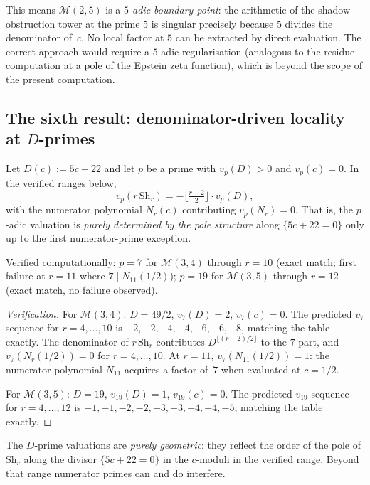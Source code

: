 \documentclass[11pt]{article}
\newcommand{\cM}{\mathcal{M}}
\begin{document}
This means $\cM(2,5)$ is a \emph{$5$-adic boundary point}: the
arithmetic of the shadow obstruction tower at the prime $5$ is singular
precisely because $5$ divides the denominator of~$c$.  No local
factor at $5$ can be extracted by direct evaluation.  The
correct approach would require a $5$-adic regularisation
(analogous to the residue computation at a pole of the Epstein
zeta function), which is beyond the scope of the present
computation.

\subsection*{The sixth result: denominator-driven locality at
$D$-primes}

\begin{proposition}
\label{prop:D-prime-locality}
Let $D(c) := 5c + 22$ and let $p$ be a prime with
$v_p(D) > 0$ and $v_p(c) = 0$.  In the verified ranges below,
\[
v_p(r\,\mathrm{Sh}_r)
= -\bigl\lfloor\tfrac{r-2}{2}\bigr\rfloor \cdot v_p(D),
\]
with the numerator polynomial $N_r(c)$ contributing
$v_p(N_r) = 0$.  That is, the $p$-adic valuation is
\emph{purely determined by the pole structure} along
$\{5c + 22 = 0\}$ only up to the first numerator-prime
exception.

Verified computationally: $p = 7$ for $\cM(3,4)$ through
$r = 10$ \textup{(}exact match; first failure at $r = 11$
where $7 \mid N_{11}(1/2)$\textup{)};
$p = 19$ for $\cM(3,5)$ through $r = 12$ \textup{(}exact
match, no failure observed\textup{)}.
\end{proposition}

\begin{proof}[Verification]
For $\cM(3,4)$: $D = 49/2$, $v_7(D) = 2$, $v_7(c) = 0$.
The predicted $v_7$ sequence for $r = 4,\ldots,10$ is
$-2,-2,-4,-4,-6,-6,-8$, matching the table exactly.
The denominator of $r\,\mathrm{Sh}_r$ contributes
$D^{\lfloor(r-2)/2\rfloor}$ to the $7$-part, and
$v_7(N_r(1/2)) = 0$ for $r = 4, \ldots, 10$.
At $r = 11$, $v_7(N_{11}(1/2)) = 1$: the numerator
polynomial $N_{11}$ acquires a factor of~$7$ when evaluated
at $c = 1/2$.

For $\cM(3,5)$: $D = 19$, $v_{19}(D) = 1$, $v_{19}(c) = 0$.
The predicted $v_{19}$ sequence for $r = 4,\ldots,12$ is
$-1,-1,-2,-2,-3,-3,-4,-4,-5$, matching the table exactly.
\end{proof}

The $D$-prime valuations are \emph{purely geometric}: they
reflect the order of the pole of $\mathrm{Sh}_r$ along the
divisor $\{5c + 22 = 0\}$ in the $c$-moduli in the verified
range.  Beyond that range numerator primes can and do interfere.
\end{document}
